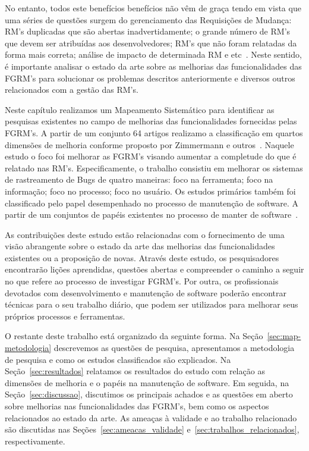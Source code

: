 No entanto, todos este benefícios benefícios não vêm de graça tendo em vista que
uma séries de questões surgem do gerenciamento das Requisições de Mudança: RM's
duplicadas que são abertas inadvertidamente; o grande número de RM's que devem
ser atribuídas aos desenvolvedores; RM's que não foram relatadas da forma mais
correta; análise de impacto de determinada RM e
etc~\cite{cavalcanti2014challenges}. Neste sentido, é importante analisar o
estado da arte sobre as melhorias das funcionalidades das FGRM's para solucionar
os problemas descritos anteriormente e diversos outros relacionados com a gestão
das RM's.

Neste capítulo realizamos um Mapeamento Sistemático para identificar as
pesquisas existentes no campo de melhorias das funcionalidades fornecidas pelas
FGRM's. A partir de um conjunto 64 artigos realizamo a classificação em quartos
dimensões de melhoria conforme proposto por Zimmermann e
outros~\cite{zimmermann2009improving}. Naquele estudo o foco foi melhorar as
FGRM's visando aumentar a completude do que é relatado nas RM's.
Especificamente, o trabalho consistiu em melhorar os sistemas de rastreamento de
Bugs de quatro maneiras: foco na ferramenta; foco na informação; foco no
processo; foco no usuário. Os estudos primários também foi classificado pelo
papel desempenhado no processo de manutenção de software. A partir de um
conjuntos de papéis existentes no processo de manter de
software~\cite{Polo1999}.

As contribuições deste estudo estão relacionadas com o fornecimento de uma visão
abrangente sobre o estado da arte das melhorias das funcionalidades existentes
ou a proposição de novas. Através deste estudo, os pesquisadores encontrarão
lições aprendidas, questões abertas e compreender o caminho a seguir no que
refere ao processo de investigar FGRM's. Por outra, os profissionais devotados
com desenvolvimento e manutenção de software poderão encontrar técnicas para o
seu trabalho diário, que podem ser utilizados para melhorar seus próprios
processos e ferramentas.

O restante deste trabalho está organizado da seguinte forma. Na
Seção~\ref{sec:map-metodologia} descrevemos as questões de pesquisa,
apresentamos a metodologia de pesquisa e como os estudos classificados são
explicados.  Na Seção~\ref{sec:resultados} relatamos os resultados do estudo com
relação as dimensões de melhoria e o papéis na manutenção de software. Em
seguida, na Seção~\ref{sec:discussao}, discutimos os principais achados e as
questões em aberto sobre melhorias nas funcionalidades das FGRM's, bem como os
aspectos relacionados ao estado da arte. As ameaças à validade e ao trabalho
relacionado são discutidas nas Seções~\ref{sec:ameacas_validade}
e~\ref{sec:trabalhos_relacionados}, respectivamente.

